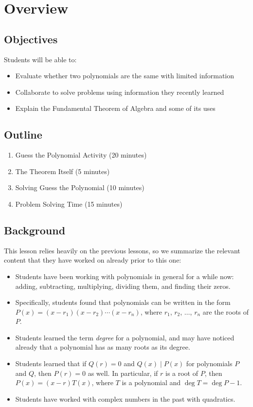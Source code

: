 \section{Overview}

\subsection{Objectives}

Students will be able to:
\begin{itemize}
    \item Evaluate whether two polynomials are the same with limited information
    \item Collaborate to solve problems using information they recently learned
    \item Explain the Fundamental Theorem of Algebra and some of its uses
\end{itemize}

\subsection{Outline}

\begin{enumerate}
    \item Guess the Polynomial Activity (20 minutes)
    \item The Theorem Itself (5 minutes)
    \item Solving Guess the Polynomial (10 minutes)
    \item Problem Solving Time (15 minutes)
\end{enumerate}

\subsection{Background}

This lesson relies heavily on the previous lessons, so we summarize the relevant content that they have worked on already prior to this one:
\begin{itemize}
    \item Students have been working with polynomials in general for a while now: adding, subtracting, multiplying, dividing them, and finding their zeros.
    \item Specifically, students found that polynomials can be written in the form $P(x) = (x-r_1)(x-r_2)\cdots (x-r_n)$, where $r_1$, $r_2$, $\dots$, $r_n$ are the roots of $P$.
    \item Students learned the term \textit{degree} for a polynomial, and may have noticed already that a polynomial has as many roots as its degree.
    \item Students learned that if $Q(r) = 0$ and $Q(x) \mid P(x)$ for polynomials $P$ and $Q$, then $P(r) = 0$ as well. In particular, if $r$ is a root of $P$, then $P(x) = (x-r)T(x)$, where $T$ is a polynomial and $\deg T = \deg P - 1$.
    \item Students have worked with complex numbers in the past with quadratics.
\end{itemize}

